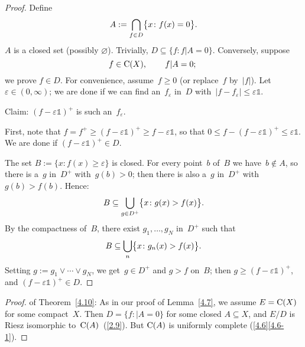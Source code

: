 \documentclass[main.tex]{subfiles}
\begin{document}
\begin{proof}
Define
\begin{equation*}
A := \bigcap_{f\in D} \bigl\{ x\colon f(x)=0 \bigr\}\text{.}
\end{equation*}
$A$ is a closed set (possibly $\varnothing$).
Trivially, $D\subseteq\{ f\colon f|A=0\}$.
Conversely, suppose
\begin{equation*}
f\in \mathrm{C}(X)\text{, }\qquad f|A=0\text{; }
\end{equation*}
we prove $f\in D$.
For convenience,
assume~$f\geq 0$
(or replace~$f$ by~$|f|$).
Let~$\varepsilon\in(0,\infty)$;
we are done if we can find an~$f_\varepsilon$ in~$D$
with~$|f-f_\varepsilon|\leq \varepsilon\mathbb{1}$.

Claim:
$(f-\varepsilon\mathbb{1})^+$ is such an~$f_\varepsilon$.

First,
note that $f=f^+\geq (f-\varepsilon\mathbb{1})^+ 
\geq f-\varepsilon\mathbb{1}$,
so that $0\leq f - (f-\varepsilon \mathbb{1})^+ 
\leq \varepsilon \mathbb{1}$.
We are done if $(f-\varepsilon \mathbb{1})^+\in D$.

The set $B:=\{ x\colon f(x)\geq \varepsilon \}$ is closed.
For every point~$b$ of~$B$
we have~$b\notin A$,
so there is a~$g$ in~$D^+$ with~$g(b)>0$;
then there is also a~$g$ in~$D^+$
with $g(b)>f(b)$.
Hence:
\begin{equation*}
B \subseteq \bigcup_{g\in D^+} \bigl\{ x\colon g(x) > f(x) \bigr\}\text{.}
\end{equation*}
By the compactness of~$B$,
there exist $g_1,\dotsc,g_N$ in~$D^+$ such that
\begin{equation*}
B \subseteq \bigcup_{n} \bigl\{ x\colon g_n(x)>f(x) \bigr\}\text{.}
\end{equation*}
Setting $g:=g_1\vee \dotsb \vee g_N$,
we get~$g\in D^+$
and $g>f$ on~$B$;
then $g\geq(f-\varepsilon\mathbb{1})^+$,
and $(f-\varepsilon \mathbb{1})^+ \in D$. \xqed
\end{proof}
\begin{proof} of Theorem~\ref{4.10}:
As in our proof of Lemma~\ref{4.7},
we assume $E=\mathrm{C}(X)$ for some compact~$X$.
Then $D=\{ f\colon |A = 0 \}$ for some closed $A\subseteq X$,
and $E/D$ is Riesz isomorphic to~$\mathrm{C}(A)$~(\ref{2.9}).
But $\mathrm{C}(A)$ is uniformly complete (\ref{4.6}\ref{4.6-1}). \xqed
\end{proof}
\clearpage
\end{document}
